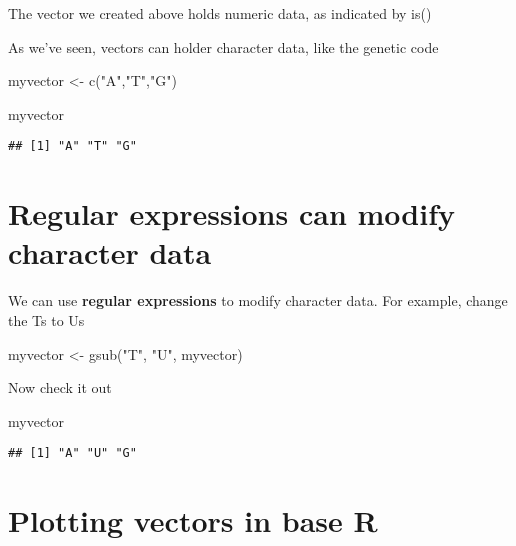 \documentclass[
]{book}
\newenvironment{Shaded}{\begin{snugshade}}{\end{snugshade}}
\newcommand{\FunctionTok}[1]{\textcolor[rgb]{0.00,0.00,0.00}{#1}}
\newcommand{\NormalTok}[1]{#1}
\newcommand{\OtherTok}[1]{\textcolor[rgb]{0.56,0.35,0.01}{#1}}
\newcommand{\StringTok}[1]{\textcolor[rgb]{0.31,0.60,0.02}{#1}}
\begin{document}
The vector we created above holds numeric data, as indicated by is()

As we've seen, vectors can holder character data, like the genetic code

\begin{Shaded}
\begin{Highlighting}[]
\NormalTok{myvector }\OtherTok{\textless{}{-}} \FunctionTok{c}\NormalTok{(}\StringTok{"A"}\NormalTok{,}\StringTok{"T"}\NormalTok{,}\StringTok{"G"}\NormalTok{)}

\NormalTok{myvector}
\end{Highlighting}
\end{Shaded}

\begin{verbatim}
## [1] "A" "T" "G"
\end{verbatim}

\hypertarget{regular-expressions-can-modify-character-data}{%
\section{Regular expressions can modify character data}\label{regular-expressions-can-modify-character-data}}

We can use \textbf{regular expressions} to modify character data. For example, change the Ts to Us

\begin{Shaded}
\begin{Highlighting}[]
\NormalTok{myvector }\OtherTok{\textless{}{-}} \FunctionTok{gsub}\NormalTok{(}\StringTok{"T"}\NormalTok{, }\StringTok{"U"}\NormalTok{, myvector)}
\end{Highlighting}
\end{Shaded}

Now check it out

\begin{Shaded}
\begin{Highlighting}[]
\NormalTok{myvector}
\end{Highlighting}
\end{Shaded}

\begin{verbatim}
## [1] "A" "U" "G"
\end{verbatim}

\hypertarget{plotting-vectors-in-base-r}{%
\section{Plotting vectors in base R}\label{plotting-vectors-in-base-r}}
\end{document}
